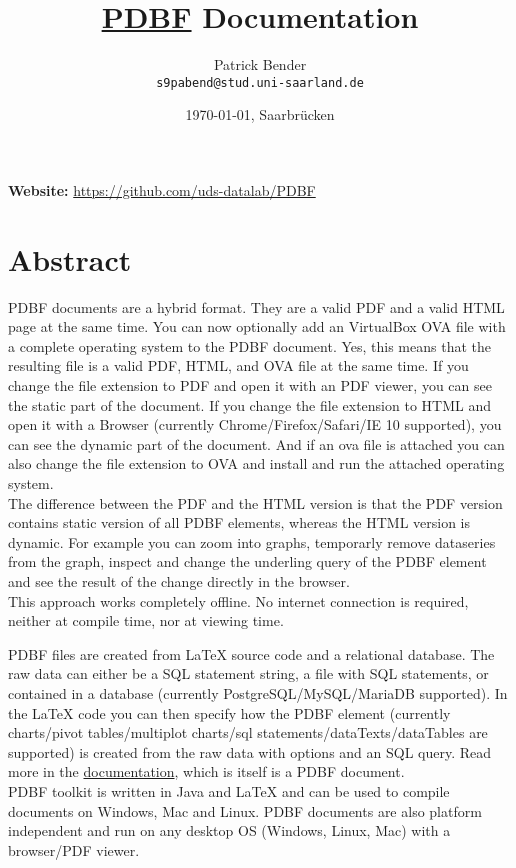\documentclass[11pt]{article}
\title{\href{https://github.com/uds-datalab/PDBF}{PDBF} Documentation}
\author{
 Patrick Bender\\
  \texttt{s9pabend@stud.uni-saarland.de}
}
\date{\today{}, Saarbrücken}
\begin{document}
\maketitle
\noindent \textbf{Website:} \url{https://github.com/uds-datalab/PDBF}\\
\noindent \textbf{}

\tableofcontents
\newpage

\section{Abstract}
PDBF documents are a hybrid format. They are a valid PDF and a valid HTML page at the same time. You can now optionally add an VirtualBox OVA file with a complete operating system to the PDBF document. Yes, this means that the resulting file is a valid PDF, HTML, and OVA file at the same time. If you change the file extension to PDF and open it with an PDF viewer, you can see the static part of the document. If you change the file extension to HTML and open it with a Browser (currently Chrome/Firefox/Safari/IE 10 supported), you can see the dynamic part of the document. And if an ova file is attached you can also change the file extension to OVA and install and run the attached operating system.\\
The difference between the PDF and the HTML version is that the PDF version contains static version of all PDBF elements, whereas the HTML version is dynamic. For example you can zoom into graphs, temporarly remove dataseries from the graph, inspect and change the underling query of the PDBF element and see the result of the change directly in the browser.\\
This approach works completely offline. No internet connection is required, neither at compile time, nor at viewing time.

\noindent PDBF files are created from LaTeX source code and a relational database. The raw data can either be a SQL statement string, a file with SQL statements, or contained in a database (currently PostgreSQL/MySQL/MariaDB supported). In the LaTeX code you can then specify how the PDBF element (currently charts/pivot tables/multiplot charts/sql statements/dataTexts/dataTables are supported) is created from the raw data with options and an SQL query. Read more in the \href{http://uds-datalab.github.io/PDBF/}{documentation}, which is itself is a PDBF document.\\

\noindent PDBF toolkit is written in Java and LaTeX and can be used to compile documents on Windows, Mac and Linux. PDBF documents are also platform independent and run on any desktop OS (Windows, Linux, Mac) with a browser/PDF viewer.\\
\end{document}
